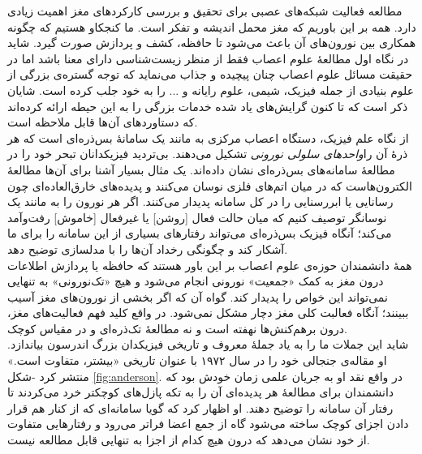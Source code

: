 مطالعه فعالیت شبکه‌های عصبی برای تحقیق و بررسی کارکردهای مغز اهمیت زیادی دارد. همه بر این باوریم که مغز محمل اندیشه و تفکر است. ما کنجکاو هستیم که چگونه همکاری بین نورون‌های آن باعث می‌شود تا حافظه، کشف و پردازش صورت گیرد. شاید در نگاه اول مطالعهٔ علوم اعصاب فقط از منظر زیست‌شناسی دارای معنا باشد اما در حقیقت مسائل علوم اعصاب چنان پیچیده و جذاب می‌نماید که توجه گستره‌ی بزرگی از علوم بنیادی از جمله فیزیک، شیمی، علوم رایانه و ... را به خود جلب کرده است. شایان ذکر است که تا کنون گرایش‌های یاد شده خدمات بزرگی را به این حیطه‌ ارائه کرده‌اند که دستاوردهای آن‌ها قابل ملاحظه است.\\

از نگاه علم فیزیک، دستگاه اعصاب مرکزی به مانند یک سامانهٔ بس‌ذره‌ای است که هر ذرهٔ آن را\emph{واحدهای سلولی نورونی} تشکیل می‌دهند. بی‌تردید فیزیکدانان تبحر خود را در مطالعهٔ سامانه‌های بس‌ذره‌ای نشان داده‌اند. یک مثال بسیار آشنا برای آن‌ها مطالعهٔ الکترون‌هاست که در میان اتم‌های فلزی نوسان می‌کنند و پدیده‌های خارق‌العاده‌ای چون رسانایی یا ابررسنایی را در کل سامانه پدیدار می‌کنند. اگر هر نورون را به مانند یک نوسانگر توصیف کنیم که میان حالت فعال [روشن] یا غیرفعال [خاموش] رفت‌وآمد می‌کند؛ آنگاه فیزیک بس‌ذره‌ای می‌تواند رفتارهای بسیاری از این سامانه را برای ما آشکار کند و چگونگی رخداد آن‌ها را با مدلسازی توضیح دهد.\\

همهٔ دانشمندان حوزه‌ی علوم اعصاب بر این باور هستند که حافظه یا پردازش اطلاعات درون مغز به کمک «جمعیت» نورونی انجام می‌شود و هیچ «تک‌نورونی» به تنهایی نمی‌تواند این خواص را پدیدار کند. گواه آن که اگر بخشی از نورون‌های مغز آسیب ببینند؛ آنگاه فعالبت کلی مغز دچار مشکل نمی‌شود. در واقع کلید فهم فعالیت‌های مغز، درون برهم‌کنش‌ها نهفته است و نه مطالعهٔ تک‌ذره‌ای و در مقیاس کوچک.\\

شاید این جملات ما را به یاد جملهٔ معروف و تاریخی فیزیکدان بزرگ اندرسون بیاندازد. او مقاله‌ی جنجالی خود را در سال ۱۹۷۲ با عنوان تاریخی «بیشتر، متفاوت است.» منتشر کرد -شکل \ref{fig:anderson}. در واقع نقد او به جریان علمی زمان خودش بود که دانشمندان برای مطالعهٔ هر پدیده‌ای آن را به تکه ‌پازل‌های کوچکتر خرد می‌کردند تا رفتار آن سامانه را توضیح دهند. او اظهار کرد که گویا سامانه‌ای که از کنار هم قرار دادن اجزای کوچک ساخته می‌شود گاه از جمع اعضا فراتر می‌رود و رفتارهایی متفاوت از خود نشان می‌دهد که درون هیچ کدام از اجزا به تنهایی قابل مطالعه نیست.\\

